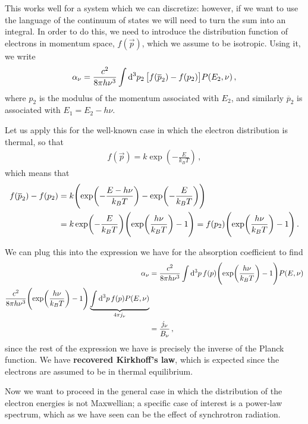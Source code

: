 \documentclass[main.tex]{subfiles}
\begin{document}
This works well for a system which we can discretize: however, if we want to use the language of the continuum of states we will need to turn the sum into an integral.
In order to do this, we need to introduce the distribution function of electrons in momentum space, \(f(\vec{p})\), which we assume to be isotropic. Using it, we write 
%
\begin{align}
\alpha _\nu = 
\frac{c^2}{8 \pi h \nu^3}
\int \dd[3]{p_2 } \qty[ f(\overline{p}_2 )- f(p_2 )]P (E_2 , \nu )
\,,
\end{align}
%
where \(p_2 \) is the modulus of the momentum associated with \(E_2 \), and similarly \(\overline{p}_2\) is associated with \(E_1 = E_2 - h \nu \). 

Let us apply this for the well-known case in which the electron distribution is thermal, so that 
%
\begin{align}
f(\vec{p}) = k \exp(- \frac{E}{k_B T})
\,,
\end{align}
%
which means that 
%
\begin{align}
f(\overline{p}_2) - f(p_2) &= k \qty(\exp(- \frac{E - h \nu }{k_B T}) - \exp(- \frac{E}{k_B T}))  \\
&= k \exp(- \frac{E}{k_B T}) \qty(\exp(\frac{h \nu }{k_B T}) - 1)
= f(p_2) \qty(\exp(\frac{h \nu }{k_B T}) - 1)
\,.
\end{align}

We can plug this into the expression we have for the absorption  coefficient  to find 
%
\begin{align}
\alpha _\nu &=
\frac{c^2}{8 \pi h \nu^3} \int \dd[3]{p} f(p) \qty(\exp(\frac{h \nu }{k_B T}) - 1) P(E, \nu )  \\
\frac{c^2}{8 \pi h \nu^3} \qty(\exp(\frac{h \nu }{k_B T}) - 1) \underbrace{\int \dd[3]{p} f(p) P(E, \nu ) }_{4 \pi j_\nu }  \\
&= \frac{j_\nu}{B_\nu }
\,,
\end{align}
%
since the rest of the expression we have is precisely the inverse of the Planck function. 
We have \textbf{recovered Kirkhoff's law}, which is expected since the electrons are assumed to be in thermal equilibrium. 

Now we want to proceed in the general case in which the distribution of the electron energies is not Maxwellian; a specific case of interest is a power-law spectrum, which as we have seen can be the effect of synchrotron radiation.

\end{document}
